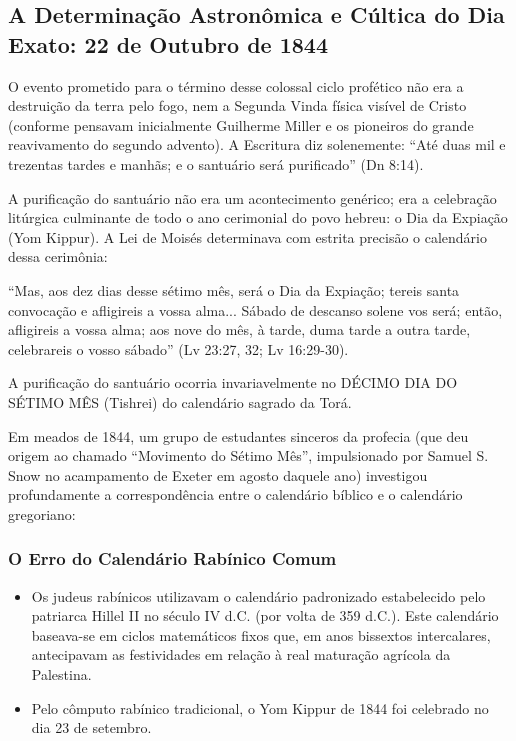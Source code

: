 \subsection{A Determinação Astronômica e Cúltica do Dia Exato: 22 de Outubro de 1844}


O evento prometido para o término desse colossal ciclo profético não era a destruição da terra pelo fogo, nem a Segunda Vinda física visível de Cristo (conforme pensavam inicialmente Guilherme Miller e os pioneiros do grande reavivamento do segundo advento). A Escritura diz solenemente: ``Até duas mil e trezentas tardes e manhãs; e o santuário será purificado'' (Dn 8:14).

A purificação do santuário não era um acontecimento genérico; era a celebração litúrgica culminante de todo o ano cerimonial do povo hebreu: o Dia da Expiação (Yom Kippur). A Lei de Moisés determinava com estrita precisão o calendário dessa cerimônia:

``Mas, aos dez dias desse sétimo mês, será o Dia da Expiação; tereis santa convocação e afligireis a vossa alma... Sábado de descanso solene vos será; então, afligireis a vossa alma; aos nove do mês, à tarde, duma tarde a outra tarde, celebrareis o vosso sábado'' (Lv 23:27, 32; Lv 16:29-30).

A purificação do santuário ocorria invariavelmente no DÉCIMO DIA DO SÉTIMO MÊS (Tishrei) do calendário sagrado da Torá.

Em meados de 1844, um grupo de estudantes sinceros da profecia (que deu origem ao chamado ``Movimento do Sétimo Mês'', impulsionado por Samuel S. Snow no acampamento de Exeter em agosto daquele ano) investigou profundamente a correspondência entre o calendário bíblico e o calendário gregoriano:

\subsubsection*{O Erro do Calendário Rabínico Comum}
\begin{itemize}
  \item Os judeus rabínicos utilizavam o calendário padronizado estabelecido pelo patriarca Hillel II no século IV d.C. (por volta de 359 d.C.). Este calendário baseava-se em ciclos matemáticos fixos que, em anos bissextos intercalares, antecipavam as festividades em relação à real maturação agrícola da Palestina.
  \item Pelo cômputo rabínico tradicional, o Yom Kippur de 1844 foi celebrado no dia 23 de setembro.
\end{itemize}


